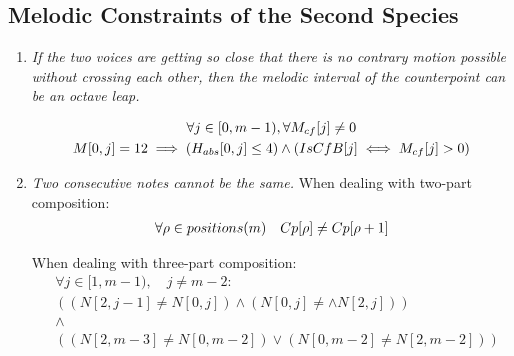 \subsection*{Melodic Constraints of the Second Species}
\begin{enumerate}[wide, label=\bfseries 2.M\arabic*]

\item\label{rule:octaveleap}{ \textit{If the two voices are getting so close that there is no contrary motion possible without crossing each other, then the melodic interval of the counterpoint can be an octave leap.}}

\begin{equation}
    \begin{gathered}
        \forall j \in [0, m-1), \forall M_{cf}[j] \neq 0\\
        M[0, j] = 12 \implies (H_{abs}[0, j] \leq 4) \land (IsCfB[j] \iff M_{cf}[j]>0)
    \end{gathered}
\end{equation}

\item\label{rule:notsamecons}{ \textit{Two consecutive notes cannot be the same.}}
When dealing with two-part composition:
\begin{equation}
    \begin{gathered}
        \forall \rho \in positions(m) \quad
        Cp[\rho] \neq Cp[\rho+1]
    \end{gathered}
\end{equation}

When dealing with three-part composition:
\begin{equation}
  \begin{aligned}
      &\forall j \in [1, m-1), \quad j \neq m-2:\\
      &((N[2, j-1] \neq N[0, j]) \land (N[0, j] \neq \land N[2, j])) \\
      &\land \\
      & ((N[2, m-3] \neq N[0, m-2]) \lor (N[0, m-2] \neq N[2, m-2]) )
  \end{aligned}
\end{equation}


\end{enumerate}
